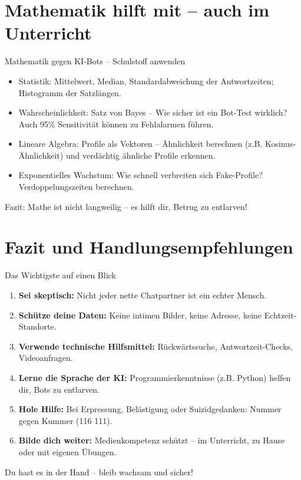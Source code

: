 \documentclass[10pt,aspectratio=169]{beamer}
\begin{document}
	\section{Mathematik hilft mit – auch im Unterricht}
	\begin{frame}{Mathematik gegen KI-Bots – Schulstoff anwenden}
		\begin{itemize}
			\item \alert{Statistik:} Mittelwert, Median, Standardabweichung der Antwortzeiten; Histogramm der Satzlängen.
			\item \alert{Wahrscheinlichkeit:} Satz von Bayes – Wie sicher ist ein Bot-Test wirklich? Auch 95\% Sensitivität können zu Fehlalarmen führen.
			\item \alert{Lineare Algebra:} Profile als Vektoren – Ähnlichkeit berechnen (z.B. Kosinus-Ähnlichkeit) und verdächtig ähnliche Profile erkennen.
			\item \alert{Exponentielles Wachstum:} Wie schnell verbreiten sich Fake-Profile? Verdoppelungszeiten berechnen.
		\end{itemize}
		\alert{Fazit:} Mathe ist nicht langweilig – es hilft dir, Betrug zu entlarven!
	\end{frame}
	
	\section{Fazit und Handlungsempfehlungen}
	\begin{frame}{Das Wichtigste auf einen Blick}
		\begin{enumerate}
			\item \textbf{Sei skeptisch:} Nicht jeder nette Chatpartner ist ein echter Mensch.
			\item \textbf{Schütze deine Daten:} Keine intimen Bilder, keine Adresse, keine Echtzeit-Standorte.
			\item \textbf{Verwende technische Hilfsmittel:} Rückwärtssuche, Antwortzeit-Checks, Videoanfragen.
			\item \textbf{Lerne die Sprache der KI:} Programmierkenntnisse (z.B. Python) helfen dir, Bots zu entlarven.
			\item \textbf{Hole Hilfe:} Bei Erpressung, Belästigung oder Suizidgedanken: Nummer gegen Kummer (116 111).
			\item \textbf{Bilde dich weiter:} Medienkompetenz schützt – im Unterricht, zu Hause oder mit eigenen Übungen.
		\end{enumerate}
		\alert{Du hast es in der Hand – bleib wachsam und sicher!}
	\end{frame}
	
\end{document}
